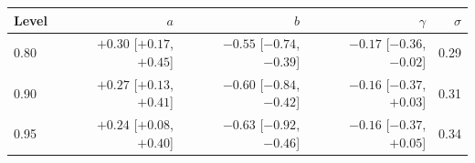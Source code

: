 \begin{tabular}{lrrrr}
\toprule
Level & $a$ & $b$ & $\gamma$ & $\sigma$ \\
\midrule
0.80 & $+0.30$ [$+0.17$, $+0.45$] & $-0.55$ [$-0.74$, $-0.39$] & $-0.17$ [$-0.36$, $-0.02$] & 0.29 \\
0.90 & $+0.27$ [$+0.13$, $+0.41$] & $-0.60$ [$-0.84$, $-0.42$] & $-0.16$ [$-0.37$, $+0.03$] & 0.31 \\
0.95 & $+0.24$ [$+0.08$, $+0.40$] & $-0.63$ [$-0.92$, $-0.46$] & $-0.16$ [$-0.37$, $+0.05$] & 0.34 \\
\bottomrule
\end{tabular}
